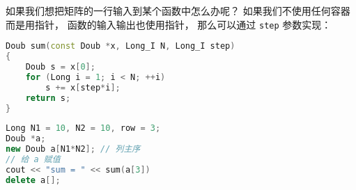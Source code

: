 
如果我们想把矩阵的一行输入到某个函数中怎么办呢？ 如果我们不使用任何容器而是用指针， 函数的输入输出也使用指针， 那么可以通过 \verb|step| 参数实现：
\begin{lstlisting}[language=cpp]
Doub sum(const Doub *x, Long_I N, Long_I step)
{
    Doub s = x[0];
    for (Long i = 1; i < N; ++i)
        s += x[step*i];
    return s;
}
\end{lstlisting}

\begin{lstlisting}[language=cpp]
Long N1 = 10, N2 = 10, row = 3;
Doub *a;
new Doub a[N1*N2]; // 列主序
// 给 a 赋值
cout << "sum = " << sum(a[3])
delete a[];
\end{lstlisting}
